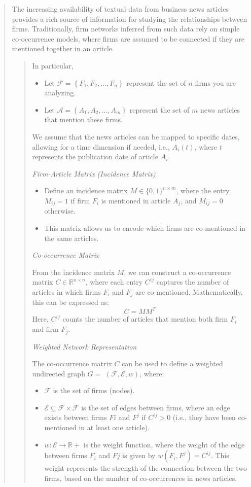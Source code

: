 \begin{quote}
The increasing availability of textual data from business news articles provides a rich source of information for studying the relationships between firms. Traditionally, firm networks inferred from such data rely on simple co-occurrence models, where firms are assumed to be connected if they are mentioned together in an article. 

\begin{quote}
In particular, 
\begin{itemize}
  \item Let $\mathcal{F}=\left\{F_1, F_2, \ldots, F_n\right\}$ represent the set of $n$ firms you are analyzing.
  \item Let $\mathcal{A}=\left\{A_1, A_2, \ldots, A_m\right\}$ represent the set of $m$ news articles that mention these firms.
\end{itemize}
We assume that the news articles can be mapped to specific dates, allowing for a time dimension if needed, i.e., $A_i(t)$, where $t$ represents the publication date of article $A_i$.

\textit{Firm-Article Matrix (Incidence Matrix)}

\begin{itemize}
  \item Define an incidence matrix $M \in\{0,1\}^{n \times m}$, where the entry $M_{i j}=1$ if firm $F_i$ is mentioned in article $A_j$, and $M_{i j}=0$ otherwise.
  \item This matrix allows us to encode which firms are co-mentioned in the same articles.
\end{itemize}

\textit{Co-occurrence Matrix}

From the incidence matrix $M$, we can construct a co-occurrence matrix $C \in \mathbb{R}^{n \times n}$, where each entry $C^{i j}$ captures the number of articles in which firms $F_i$ and $F_j$ are co-mentioned.
Mathematically, this can be expressed as:
$$
C=M M^T
$$
Here, $C^{i j}$ counts the number of articles that mention both firm $F_i$ and firm $F_j$.


\textit{Weighted Network Representation}

The co-occurrence matrix $C$ can be used to define a weighted undirected graph $G=$ $(\mathcal{F}, \mathcal{E}, w)$, where:
\begin{itemize}
  \item $\mathcal{F}$ is the set of firms (nodes).
  \item $\mathcal{E} \subseteq \mathcal{F} \times \mathcal{F}$ is the set of edges between firms, where an edge exists between firms $F i$ and $F^j$ if $C^{i j}>0$ (i.e., they have been co-mentioned in at least one article).
  \item $w: \mathcal{E} \rightarrow \mathbb{R}+$ is the weight function, where the weight of the edge between firms $F_i$ and $F j$ is given by $w\left(F_i, F^j\right)=C^{i j}$. This weight represents the strength of the connection between the two firms, based on the number of co-occurrences in news articles.
\end{itemize}


\end{quote}
\end{quote}
